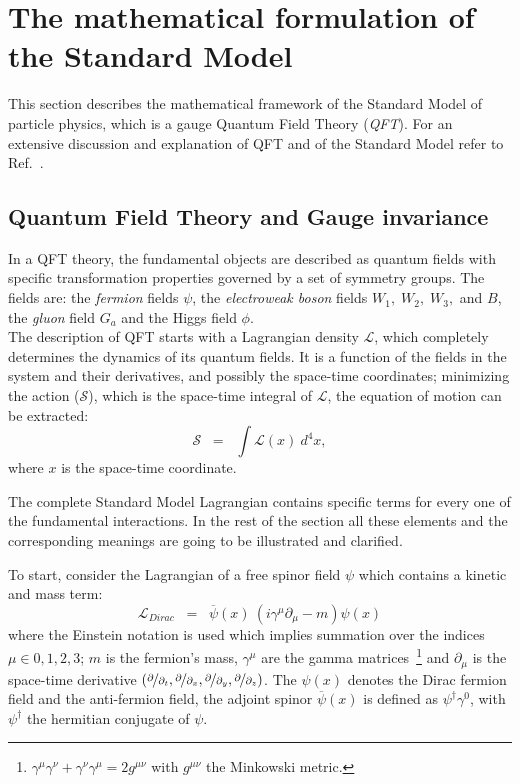 \section{The mathematical formulation of the Standard Model}\label{sec:mathSM}
This section describes the mathematical framework of the Standard Model of particle physics, which is a gauge Quantum Field Theory (\emph{QFT}). For an extensive discussion and explanation of QFT and of the Standard Model refer to Ref.~\cite{Bardin:1999ak}.
\subsection{Quantum Field Theory and Gauge invariance}\label{sec:qft}
In a QFT theory, the fundamental objects are described as quantum fields with specific transformation properties governed by a set of symmetry groups. The fields are: the \emph{fermion} fields $\psi$, the \emph{electroweak boson} fields $W_1, \; W_2, \; W_3,$ and $B$, the \emph{gluon} field $G_a$ and the Higgs field $\phi$. \\
The description of QFT starts with a Lagrangian density $\mathcal{L}$, which completely determines the dynamics of its quantum fields. It is a function of the fields in the system and their derivatives, and possibly the space-time coordinates; minimizing the action ($\mathcal{S}$), which is the space-time integral of $\mathcal{L}$, the equation of motion can be extracted:
\begin{equation}
\label{eq:action}
 \mathcal{S} \;\; = \;\; \int \mathcal{L}(x) \ d^4x,
\end{equation}
where $x$ is the space-time coordinate.

The complete Standard Model Lagrangian contains specific terms for every one of the fundamental interactions. In the rest of the section all these elements and the corresponding meanings are going to be illustrated and clarified.

To start, consider the Lagrangian of a free spinor field $\psi$ which contains a kinetic and mass term:
\begin{equation}
\label{eq:dirac}
 \mathcal{L}_{Dirac} \;\; = \;\; \overline{\psi}(x)\ (i\gamma^{\mu}\partial_{\mu} - m ) \psi(x)
\end{equation}
where the Einstein notation is used which implies summation over the indices $\mu \in 0,1,2,3$; $m$ is the fermion's mass, $\gamma^{\mu}$ are the gamma matrices~\footnote{$\gamma^{\mu}\gamma^{\nu} + \gamma^{\nu}\gamma^{\mu} = 2g^{\mu\nu}$ with $g^{\mu\nu}$ the Minkowski metric.} and $\partial_{\mu}$ is the space-time derivative $(\nicefrac{\partial}{\partial_{t}}, \nicefrac{\partial}{\partial_{x}}, \nicefrac{\partial}{\partial_{y}}, \nicefrac{\partial}{\partial_{z}})$. The $\psi(x)$ denotes the Dirac fermion field and the anti-fermion field, the adjoint spinor $\overline{\psi}(x)$ is defined as $\psi^\dag\gamma^{0}$, with $\psi^\dag$ the hermitian conjugate of $\psi$.

